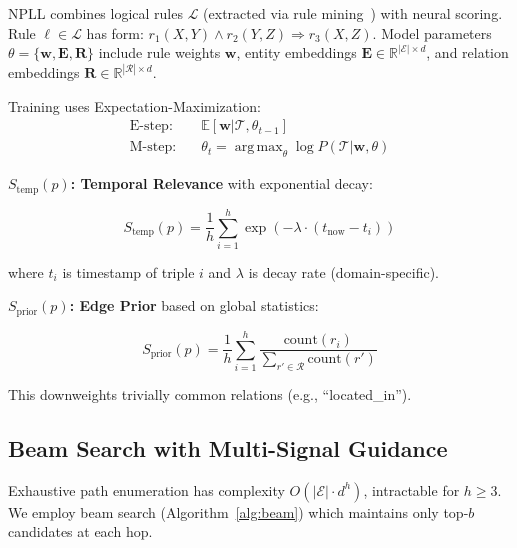 \documentclass[10pt,twocolumn]{article}
\DeclareMathOperator*{\argmax}{arg\,max}
\begin{document}
NPLL combines logical rules $\mathcal{L}$ (extracted via rule mining~\cite{yang2017differentiable}) with neural scoring. Rule $\ell \in \mathcal{L}$ has form: $r_1(X,Y) \wedge r_2(Y,Z) \Rightarrow r_3(X,Z)$. Model parameters $\theta = \{\mathbf{w}, \mathbf{E}, \mathbf{R}\}$ include rule weights $\mathbf{w}$, entity embeddings $\mathbf{E} \in \mathbb{R}^{|\mathcal{E}| \times d}$, and relation embeddings $\mathbf{R} \in \mathbb{R}^{|\mathcal{R}| \times d}$.

Training uses Expectation-Maximization:
\begin{align}
\text{E-step:} \quad & \mathbb{E}[\mathbf{w} | \mathcal{T}, \theta_{t-1}] \\
\text{M-step:} \quad & \theta_t = \argmax_{\theta} \log P(\mathcal{T} | \mathbf{w}, \theta)
\end{align}

\textbf{$S_{\text{temp}}(p)$: Temporal Relevance} with exponential decay:

\begin{equation}
S_{\text{temp}}(p) = \frac{1}{h} \sum_{i=1}^{h} \exp\left(-\lambda \cdot (t_{\text{now}} - t_i)\right)
\end{equation}

where $t_i$ is timestamp of triple $i$ and $\lambda$ is decay rate (domain-specific).

\textbf{$S_{\text{prior}}(p)$: Edge Prior} based on global statistics:

\begin{equation}
S_{\text{prior}}(p) = \frac{1}{h} \sum_{i=1}^{h} \frac{\text{count}(r_i)}{\sum_{r' \in \mathcal{R}} \text{count}(r')}
\end{equation}

This downweights trivially common relations (e.g., ``located\_in'').

\subsection{Beam Search with Multi-Signal Guidance}

Exhaustive path enumeration has complexity $O(|\mathcal{E}| \cdot d^h)$, intractable for $h \geq 3$. We employ beam search (Algorithm~\ref{alg:beam}) which maintains only top-$b$ candidates at each hop.
\end{document}
